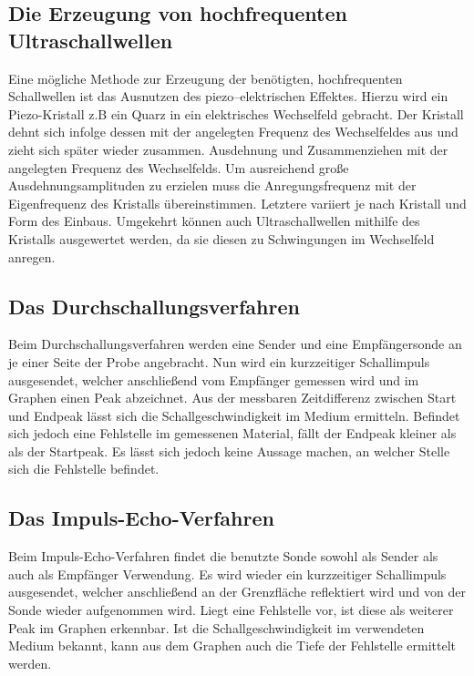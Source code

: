 \subsection{Die Erzeugung von hochfrequenten Ultraschallwellen}
Eine mögliche Methode zur Erzeugung der benötigten, hochfrequenten Schallwellen
ist das Ausnutzen des piezo--elektrischen Effektes. Hierzu wird ein Piezo-Kristall z.B ein Quarz
in ein elektrisches Wechselfeld gebracht. Der Kristall dehnt sich infolge dessen
mit der angelegten Frequenz des Wechselfeldes aus und zieht sich später wieder zusammen.
Ausdehnung und Zusammenziehen mit der angelegten Frequenz des Wechselfelds. Um
ausreichend große Ausdehnungsamplituden zu erzielen muss die Anregungsfrequenz
mit der Eigenfrequenz des Kristalls übereinstimmen. Letztere variiert je nach Kristall
und Form des Einbaus. Umgekehrt können auch Ultraschallwellen mithilfe des Kristalls
ausgewertet werden, da sie diesen zu Schwingungen im Wechselfeld anregen.
\subsection{Das Durchschallungsverfahren}
Beim Durchschallungsverfahren werden eine Sender und eine Empfängersonde an je
einer Seite der Probe angebracht. Nun wird ein kurzzeitiger Schallimpuls ausgesendet, welcher
anschließend vom Empfänger gemessen wird und im Graphen einen Peak abzeichnet. Aus
der messbaren Zeitdifferenz zwischen Start und Endpeak lässt sich die Schallgeschwindigkeit im Medium ermitteln.
Befindet sich jedoch eine Fehlstelle im gemessenen Material, fällt der Endpeak kleiner als als der Startpeak.
Es lässt sich jedoch keine Aussage machen, an welcher Stelle sich die Fehlstelle befindet.

\subsection{Das Impuls-Echo-Verfahren}
Beim Impuls-Echo-Verfahren findet die benutzte Sonde sowohl als Sender als auch
als Empfänger Verwendung. Es wird wieder ein kurzzeitiger Schallimpuls ausgesendet,
welcher anschließend an der Grenzfläche reflektiert wird und von der Sonde wieder aufgenommen wird.
Liegt eine Fehlstelle vor, ist diese als weiterer Peak im Graphen erkennbar. Ist
die Schallgeschwindigkeit im verwendeten Medium bekannt, kann aus dem Graphen
auch die Tiefe der Fehlstelle ermittelt werden.
